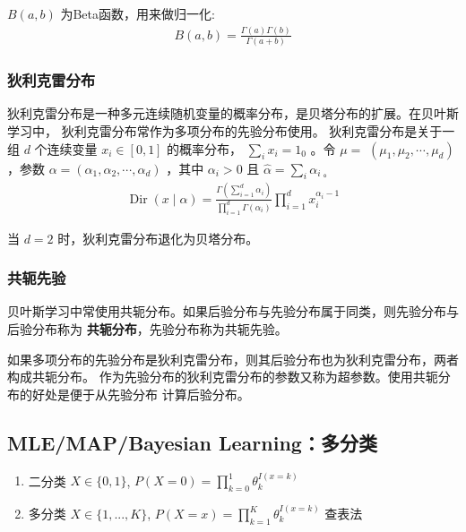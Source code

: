 \documentclass[UTF8]{ctexart}
\begin{document}
$B(a, b)$ 为Beta函数，用来做归一化:
$$
\begin{aligned}
B(a, b)=\frac{\Gamma(a) \Gamma(b)}{\Gamma(a+b)}
\end{aligned}
$$


\subsubsection{狄利克雷分布}
狄利克雷分布是一种多元连续随机变量的概率分布，是贝塔分布的扩展。在贝叶斯学习中，
狄利克雷分布常作为多项分布的先验分布使用。
狄利克雷分布是关于一组 $d$ 个连续变量 $x_{i} \in[0,1]$ 的概率分布， $\sum_{i} x_{i}=1_{0}$ 。令 $\mu=$ $\left(\mu_{1}, \mu_{2}, \cdots, \mu_{d}\right)$ ，参数 $\alpha=\left(\alpha_{1}, \alpha_{2}, \cdots, \alpha_{d}\right)$ ，其中 $\alpha_{i}>0$ 且 $\hat{\alpha}=\sum_{i} \alpha_{i \text { 。 }}$
$$
\begin{aligned}
\operatorname{Dir}(x \mid \alpha)=\frac{\Gamma(\sum^{d}_{i=1}\alpha_i)}{\prod_{i=1}^{d}\Gamma(\alpha_i)}  \prod_{i=1}^{d}x_{i}^{\alpha_{i}-1}
\end{aligned}
$$

当 $d=2$ 时，狄利克雷分布退化为贝塔分布。


\subsubsection{共轭先验}
贝叶斯学习中常使用共轭分布。如果后验分布与先验分布属于同类，则先验分布与后验分布称为
\textbf{共轭分布}，先验分布称为共轭先验。

如果多项分布的先验分布是狄利克雷分布，则其后验分布也为狄利克雷分布，两者构成共轭分布。
作为先验分布的狄利克雷分布的参数又称为超参数。使用共轭分布的好处是便于从先验分布
计算后验分布。

\subsection{MLE/MAP/Bayesian Learning：多分类}


\begin{enumerate}
    \item 二分类 $X\in\{0,1\}$, $P(X=0)=\prod^{1}_{k=0}\theta_k^{I(x=k)}$
    \item 多分类 $X\in\{1,...,K\}$, $P(X=x)=\prod^{K}_{k=1}\theta_k^{I(x=k)}$ 查表法
\end{enumerate}
\end{document}
